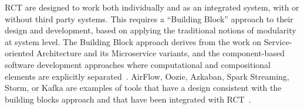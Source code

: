 \documentclass[preprint,12pt, a4paper]{elsarticle}
\begin{document}




RCT are designed to work both individually and as an integrated system, with
or without third party systems. This requires a ``Building Block'' approach
to their design and development, based on applying the traditional notions of
modularity at system level. The Building Block approach derives from the work
on Service-oriented Architecture and its Microservice variants, and the
component-based software development approaches where computational and
compositional elements are explicitly
separated~\cite{batory1992design,garlan1995architectural,lenz1988software,clemens1998component,schneider2000components}.
AirFlow, Oozie, Azkaban, Spark Streaming, Storm, or Kafka are examples of
tools that have a design consistent with the building blocks approach and
that have been integrated with RCT~\cite{turilli2019middleware}.

\end{document}
